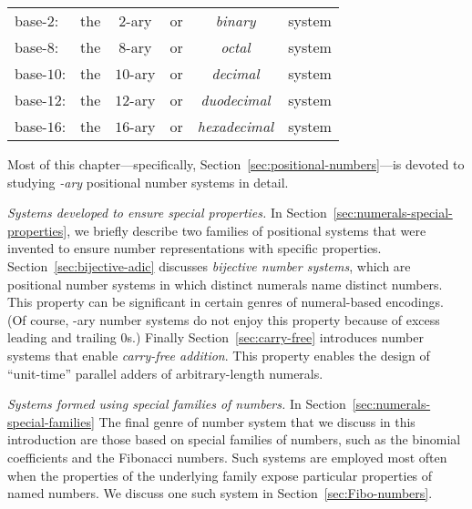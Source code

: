 \smallskip

\begin{tabular}{llclcl}
base-$2$:  & the & $2$-ary  & or & {\em binary}      & system \\
base-$8$:  & the & $8$-ary  & or & {\em octal}       & system \\
base-$10$: & the & $10$-ary & or & {\em decimal}     & system \\
base-$12$: & the & $12$-ary & or & {\em duodecimal}  & system \\
base-$16$: & the & $16$-ary & or & {\em hexadecimal} & system
\end{tabular}

\smallskip

\noindent
Most of this chapter---specifically,
Section~\ref{sec:positional-numbers}---is devoted to studying {\em
  -ary} positional number systems in detail.

\medskip

\noindent
{\it Systems developed to ensure special properties.}
In Section~\ref{sec:numerals-special-properties}, we briefly describe
two families of positional systems that were invented to ensure number
representations with specific properties.  Section~\ref{sec:bijective-adic}
discusses {\em bijective number systems},
which are positional number systems in which distinct numerals name
distinct numbers.  This property can be significant in certain genres
of numeral-based encodings.  (Of course, -ary number systems do not
enjoy this property because of excess leading and trailing $0$s.)
Finally Section~\ref{sec:carry-free} introduces number systems that
enable {\em carry-free addition}.  This property enables the design of
``unit-time'' parallel adders of arbitrary-length numerals.

\medskip

\noindent
{\it Systems formed using special families of numbers.}
%
In Section~\ref{sec:numerals-special-families}
The final genre of number system that we discuss in this introduction
are those based on special families of numbers, such as the binomial
coefficients and the Fibonacci numbers.  Such systems are employed
most often when the properties of the underlying family expose
particular properties of named numbers.  We discuss one such system in
Section~\ref{sec:Fibo-numbers}.


